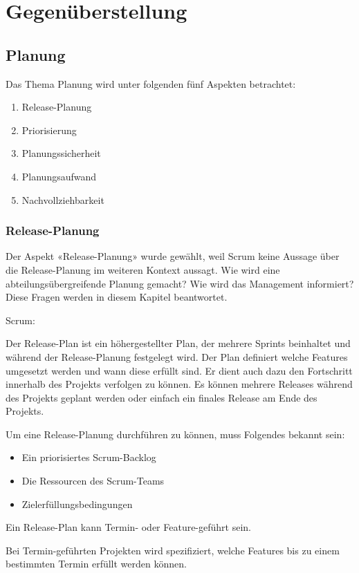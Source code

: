 \chapter{Gegenüberstellung}
\thispagestyle{fancy}
\section{Planung}

Das Thema Planung wird unter folgenden fünf Aspekten betrachtet:
\begin{enumerate}
\item Release-Planung
\item Priorisierung
\item Planungssicherheit
\item Planungsaufwand
\item Nachvollziehbarkeit
\end{enumerate}

\subsection{Release-Planung}

Der Aspekt «Release-Planung» wurde gewählt, weil Scrum keine Aussage über die Release-Planung im weiteren Kontext aussagt. Wie wird eine abteilungsübergreifende Planung gemacht? Wie wird das Management informiert? Diese Fragen werden in diesem Kapitel beantwortet.

{\Large Scrum:} \cite{planningReleaseScrum} \medskip

Der Release-Plan ist ein höhergestellter Plan, der mehrere Sprints beinhaltet und während der Release-Planung festgelegt wird. Der Plan definiert welche Features umgesetzt werden und wann diese erfüllt sind. Er dient auch dazu den Fortschritt innerhalb des Projekts verfolgen zu können. Es können mehrere Releases während des Projekts geplant werden oder einfach ein finales Release am Ende des Projekts. \medskip

Um eine Release-Planung durchführen zu können, muss Folgendes bekannt sein:
\begin{itemize}
\item Ein priorisiertes Scrum-Backlog
\item Die Ressourcen des Scrum-Teams
\item Zielerfüllungsbedingungen
\end{itemize}
Ein Release-Plan kann Termin- oder Feature-geführt sein.\smallskip

Bei Termin-geführten Projekten wird spezifiziert, welche Features bis zu einem bestimmten Termin erfüllt werden können.\smallskip


